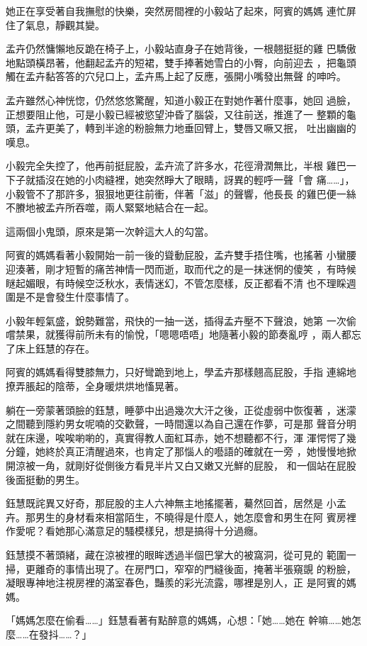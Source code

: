 她正在享受著自我撫慰的快樂，突然房間裡的小毅站了起來，阿賓的媽媽
連忙屏住了氣息，靜觀其變。

孟卉仍然慵懶地反跪在椅子上，小毅站直身子在她背後，一根翹挺挺的雞
巴驕傲地點頭橫昂著，他翻起孟卉的短裙，雙手捧著她雪白的小臀，向前迎去
，把龜頭觸在孟卉黏答答的穴兒口上，孟卉馬上起了反應，張開小嘴發出無聲
的呻吟。

孟卉雖然心神恍惚，仍然悠悠驚醒，知道小毅正在對她作著什麼事，她回
過臉，正想要阻止他，可是小毅已經被慾望沖昏了腦袋，又往前送，推進了一
整顆的龜頭，孟卉更美了，轉到半途的粉臉無力地垂回臂上，雙唇又噘又抿，
吐出幽幽的嘆息。

小毅完全失控了，他再前挺屁股，孟卉流了許多水，花徑滑潤無比，半根
雞巴一下子就插沒在她的小肉縫裡，她突然睜大了眼睛，訝異的輕呼一聲「會
痛……」，小毅管不了那許多，狠狠地更往前衝，伴著「滋」的聲響，他長長
的雞巴便一絲不賸地被孟卉所吞噬，兩人緊緊地結合在一起。

這兩個小鬼頭，原來是第一次幹這大人的勾當。

阿賓的媽媽看著小毅開始一前一後的聳動屁股，孟卉雙手捂住嘴，也搖著
小蠻腰迎湊著，剛才短暫的痛苦神情一閃而逝，取而代之的是一抹迷惘的傻笑
，有時候瞇起媚眼，有時候空泛秋水，表情迷幻，不管怎麼樣，反正都看不清
也不理睬週圍是不是會發生什麼事情了。

小毅年輕氣盛，銳勢難當，飛快的一抽一送，插得孟卉壓不下聲浪，她第
一次偷嚐禁果，就獲得前所未有的愉悅，「嗯嗯唔唔」地隨著小毅的節奏亂哼
，兩人都忘了床上鈺慧的存在。

阿賓的媽媽看得雙膝無力，只好彎跪到地上，學孟卉那樣翹高屁股，手指
連綿地撩弄脹起的陰蒂，全身暖烘烘地慉晃著。

躺在一旁蒙著頭臉的鈺慧，睡夢中出過幾次大汗之後，正從虛弱中恢復著
，迷濛之間聽到隱約男女呢喃的交歡聲，一時間還以為自己還在作夢，可是那
聲音分明就在床邊，唉唉喲喲的，真實得教人面紅耳赤，她不想聽都不行，渾
渾愕愕了幾分鐘，她終於真正清醒過來，也肯定了那惱人的囈語的確就在一旁
，她慢慢地掀開涼被一角，就剛好從側後方看見半片又白又嫩又光鮮的屁股，
和一個站在屁股後面挺動的男生。

鈺慧既詫異又好奇，那屁股的主人六神無主地搖擺著，驀然回首，居然是
小孟卉。那男生的身材看來相當陌生，不曉得是什麼人，她怎麼會和男生在阿
賓房裡作愛呢？看她那心滿意足的騷模樣兒，想是搞得十分過癮。

鈺慧摸不著頭緒，藏在涼被裡的眼眸透過半個巴掌大的被窩洞，從可見的
範圍一掃，更離奇的事情出現了。在房門口，窄窄的門縫後面，掩著半張窺覬
的粉臉，凝眼專神地注視房裡的滿室春色，豔羨的彩光流露，哪裡是別人，正
是阿賓的媽媽。

「媽媽怎麼在偷看……」鈺慧看著有點醉意的媽媽，心想：「她……她在
幹嘛……她怎麼……在發抖……？」

